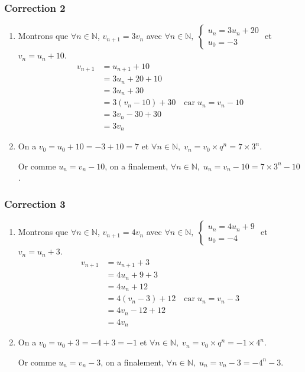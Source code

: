 \documentclass[15pt, mathserif]{beamer}
\begin{document}
\begin{frame}
\vspace{-10mm}
	\frametitle{Correction 2}
\vspace{0.5cm}\begin{enumerate}
	\item  Montrons que $\forall n \in \mathbb{N}$, $v_{n+1} = 3v_n$ avec $\forall n \in \mathbb{N}, \; \begin{cases}u_n = 3u_n+20\\ u_0 = -3\end{cases}$ et $v_n = u_n +10$.
	\begin{align*}
		v_{n+1} &= u_{n+1}+10\\
		&=3u_n+20+10\\
		&=3u_n+30\\
		&=3(v_n-10)+30 \quad \text{car} \; u_n = v_n-10\\
		&=3v_n-30+30\\
		&=3v_n
	\end{align*}
		\item On a $v_0 = u_0+10=-3+10=7$ et $\forall n \in \mathbb{N}, \; v_n = v_0 \times q^n  = 7\times3^n$.

		Or comme $u_n = v_n-10$, on a finalement, $\forall n \in \mathbb{N}, \; u_n = v_n-10= 7\times3^n-10$.
\end{enumerate}\end{frame}


\begin{frame}
\vspace{-10mm}
	\frametitle{Correction 3}
\vspace{0.5cm}\begin{enumerate}
	\item  Montrons que $\forall n \in \mathbb{N}$, $v_{n+1} = 4v_n$ avec $\forall n \in \mathbb{N}, \; \begin{cases}u_n = 4u_n+9\\ u_0 = -4\end{cases}$ et $v_n = u_n +3$.
	\begin{align*}
		v_{n+1} &= u_{n+1}+3\\
		&=4u_n+9+3\\
		&=4u_n+12\\
		&=4(v_n-3)+12 \quad \text{car} \; u_n = v_n-3\\
		&=4v_n-12+12\\
		&=4v_n
	\end{align*}
		\item On a $v_0 = u_0+3=-4+3=-1$ et $\forall n \in \mathbb{N}, \; v_n = v_0 \times q^n  = -1\times4^n$.

		Or comme $u_n = v_n-3$, on a finalement, $\forall n \in \mathbb{N}, \; u_n = v_n-3= -4^n-3$.
\end{enumerate}\end{frame}
\end{document}
